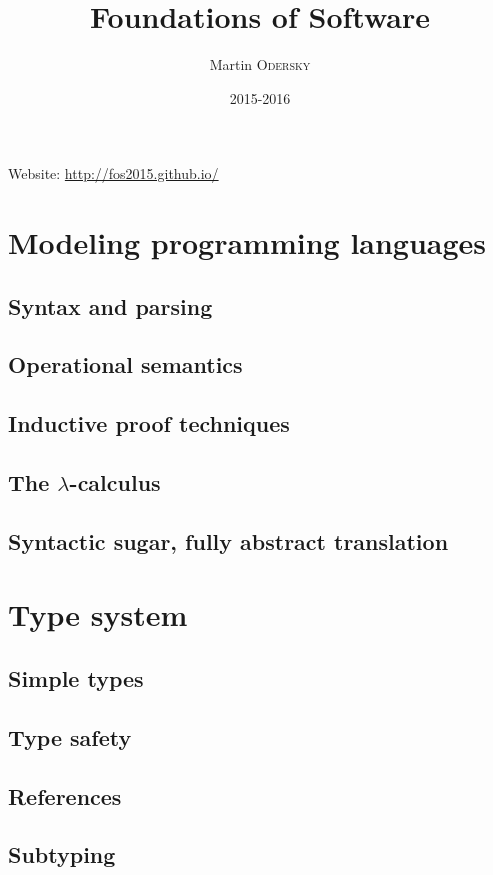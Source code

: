 

\title{Foundations of Software}
\author{Martin \textsc{Odersky}}
\date{2015-2016}


\maketitle
\tableofcontents

\newpage

Website: \url{http://fos2015.github.io/}

\part{Modeling programming languages}
    \chapter{Syntax and parsing}
    \chapter{Operational semantics}
    \chapter{Inductive proof techniques}
    \chapter{The \texorpdfstring{$\lambda$}{Lambda}-calculus}
    \chapter{Syntactic sugar, fully abstract translation}

\part{Type system}
    \chapter{Simple types}
    \chapter{Type safety}
    \chapter{References}
    \chapter{Subtyping}

